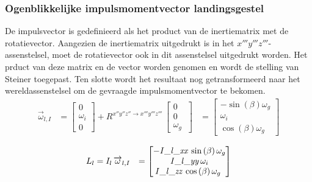 \subsubsection{Ogenblikkelijke impulsmomentvector landingsgestel}
De impulsvector is gedefinieerd als het product van de inertiematrix met de rotatievector. Aangezien de inertiematrix uitgedrukt is in het $x'''y'''z'''$-assenstelsel, moet de rotatievector ook in dit assenstelsel uitgedrukt worden. Het prduct van deze matrix en de vector worden genomen en wordt de stelling van Steiner toegepast.
Ten slotte wordt het resultaat nog getransformeerd naar het wereldassenstelsel om de gevraagde impulsmomentvector te bekomen.
\begin{equation*}
\begin{split}
\overrightarrow{\omega}_{l,I}
&=\begin{bmatrix}
0\\
\omega_{i}\\
0\
\end{bmatrix}
+R^{x''y''z'' \rightarrow x'''y'''z'''}\,
\begin{bmatrix}
0\\
0\\
\omega_{g}\
\end{bmatrix}
&=\begin{bmatrix}
-\sin \left( \beta \right) \omega_{g}
\\
\omega_{i}\\
\cos \left( \beta
 \right) \omega_{g}\
\end{bmatrix}
\end{split}
\end{equation*}

\begin{equation*}
\begin{split}
L_{l}&=I_{l}\,\overrightarrow{\omega}_{l,I}&=
\begin{bmatrix}
-{\it I\_l\_xx}\,\sin \left( \beta \right) 
\omega_{g}\\
{\it I\_l\_yy}\,\omega_{i}
\\
{\it I\_l\_zz}\,\cos \left( \beta \right) \omega_
{g}\
\end{bmatrix}
\end{split}
\end{equation*}

